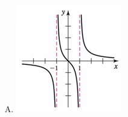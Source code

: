 \documentclass[12pt]{article}
\begin{document}
\begin{enumerate}
\begin{enumerate}[(A)]
	\item \includegraphics[scale=1.3]{exam1bsec2p4A}\hspace{3pc}
	\vspace{3pc}
\end{enumerate}


\newpage

\end{enumerate}
\end{document}
